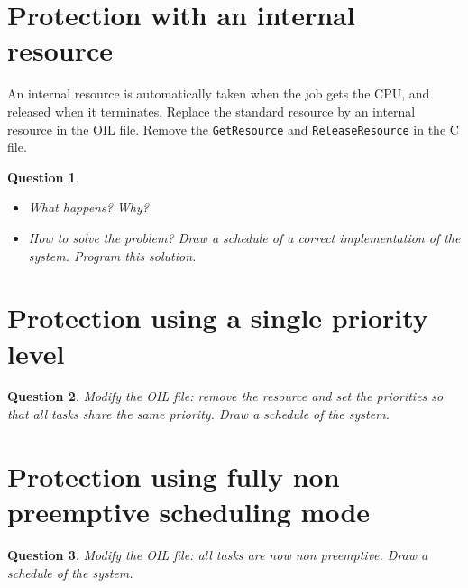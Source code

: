 \documentclass[11pt]{report}
\newtheorem{ex}{Question}
\begin{document}



\section{Protection with an internal resource}

An internal resource is automatically taken when the job gets the CPU, and released when it terminates. Replace the standard resource by an internal resource in the OIL file. Remove the \texttt{GetResource} and \texttt{ReleaseResource} in the C file.

\begin{ex}~
    \begin{itemize}
        \item
            What happens? Why?
        \item
            How to solve the problem? Draw a schedule of a correct implementation of the system. Program this solution.
    \end{itemize}
\end{ex}


\section{Protection using a single priority level}

\begin{ex}
Modify the OIL file: remove the resource and set the priorities so that all tasks share the same priority. Draw a schedule of the system.
\end{ex}

\section{Protection using fully non preemptive scheduling mode}

\begin{ex}
Modify the OIL file: all tasks are now non preemptive. Draw a schedule of the system.
\end{ex}

\end{document}
